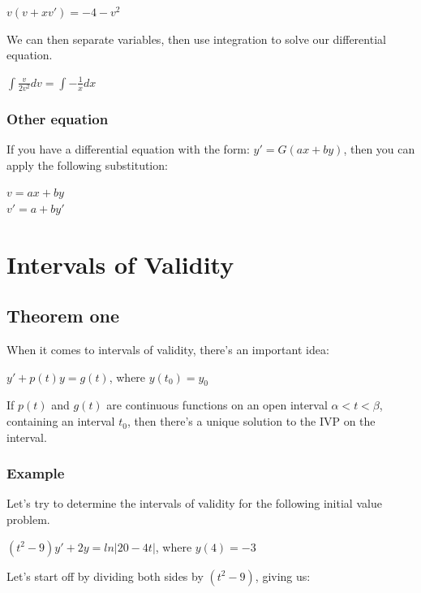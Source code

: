 \documentclass{article}
\begin{document}
\begin{center}
    $v(v + xv') = -4 - v^2$
\end{center}

We can then separate variables, then use integration to solve our differential equation.

\begin{center}
    $\int \frac{v}{2v^2} dv = \int -\frac{1}{x}dx$
\end{center}

\subsubsection{Other equation}

If you have a differential equation with the form: $y' = G(ax + by)$, then you can apply the following substitution:

\begin{center}
    $v = ax + by$ \\
    $v' = a + by'$
\end{center}
\section{Intervals of Validity}
\subsection{Theorem one}
When it comes to intervals of validity, there's an important idea:

\begin{center}
    $y' + p(t)y = g(t)$, where $y(t_0) = y_0$
\end{center}

If $p(t)$ and $g(t)$ are continuous functions on an open interval $\alpha < t < \beta$, containing an interval $t_0$, then there's a unique solution to the IVP on the interval.

\subsubsection{Example}
Let's try to determine the intervals of validity for the following initial value problem.

\begin{center}
    $(t^2 - 9)y' + 2y = ln|20 - 4t|$, where $y(4) = -3$
\end{center}

Let's start off by dividing both sides by $(t^2 - 9)$, giving us:
\end{document}
